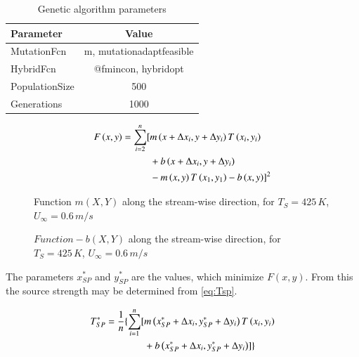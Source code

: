 \documentclass[preprint,12pt]{elsarticle}
\begin{document}
\begin{table}[!h!t!b!p]
\begin{center}
\begin{tabular}{ l c}
\hline
Parameter & Value \\ \hline
MutationFcn & m, \@ mutationadaptfeasible \\
HybridFcn & {@fmincon, hybridopt} \\
PopulationSize & 500 \\
Generations & 1000 \\
 \end{tabular}
 \end{center}
\caption{Genetic algorithm parameters}
\label{tab:gaparam}
\end{table}

\begin{equation}
\centering
\begin{split}
F\left( x,y \right) =  \sum^{n}_{i=2} [ &m\left( x+\Delta x_i, y+\Delta y_i \right) T\left( x_i,y_i\right) \\ 
 & +b\left( x+\Delta x_i, y+\Delta y_i \right) \\ 
 &-m\left( x,y\right) T\left( x_1,y_1 \right) - b\left( x,y \right) ]^2  
\label{eq:F}
\end{split}
\end{equation}

\begin{figure}[!htbp]
	\centering
	\setlength\figureheight{6cm} 
	\setlength\figurewidth{6cm}
	
	\caption{Function $m(X,Y)$ along the stream-wise direction, for $T_S = 425\, K$, $U_{\infty}=0.6\, m/s$}
	\label{fig:mVSxy}
\end{figure}
\begin{figure}[!htbp]
	\centering
	\setlength\figureheight{6cm} 
	\setlength\figurewidth{6cm}
	
	\caption{$Function -b(X,Y)$ along the stream-wise direction, for $T_S = 425\, K$, $U_{\infty}=0.6\, m/s$}
	\label{fig:bVSxy}
\end{figure}

The parameters $x^{\ast}_{SP}$ and $y^{\ast}_{SP}$ are the values, which minimize $F\left( x,y \right)$.  From this the source strength may be determined from \cref{eq:Tsp}.

\begin{equation}
\centering
\begin{split}
T^{\ast}_{SP} = \frac{1}{n} \{ \sum^{n}_{i=1} [ &m\left( x^{\ast}_{SP}+\Delta x_i, y^{\ast}_{SP}+\Delta y_i \right) T\left( x_i,y_i\right)   \\
	&  + b\left( x^{\ast}_{SP}+\Delta x_i, y^{\ast}_{SP}+\Delta y_i \right) ] \}
\label{eq:Tsp}
\end{split}
\end{equation}
\end{document}

